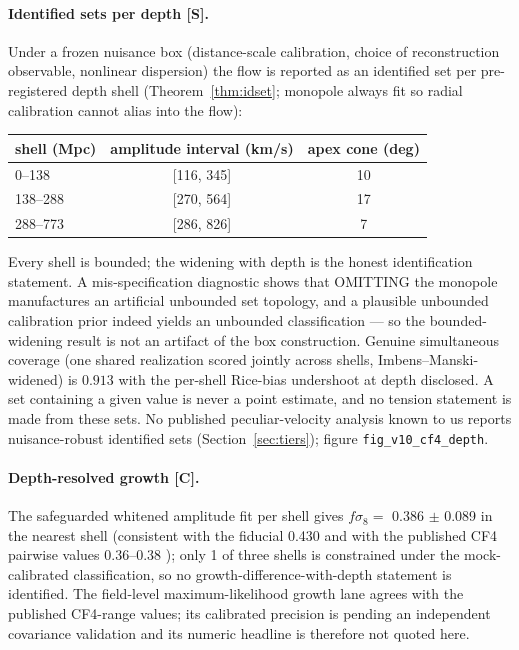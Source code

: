 \documentclass[10pt]{article}
\theoremstyle{definition}
\newcommand{\code}[1]{\texttt{\small #1}}
\newcommand{\tier}[1]{\textbf{[#1]}}
\begin{document}
\paragraph{Identified sets per depth \tier{S}.}
Under a frozen nuisance box (distance-scale calibration, choice of
reconstruction observable, nonlinear dispersion) the flow is reported
as an identified set per pre-registered depth shell
(Theorem~\ref{thm:idset}; monopole always fit so radial calibration
cannot alias into the flow):

\begin{center}\small
\begin{tabular}{lcc}
\toprule shell (Mpc) & amplitude interval (km/s) & apex cone (deg) \\
\midrule
0--138 & [116, 345] & 10 \\
138--288 & [270, 564] & 17 \\
288--773 & [286, 826] & 7 \\ \bottomrule
\end{tabular}
\end{center}

Every shell is bounded; the widening with depth is the honest
identification statement. A mis-specification diagnostic shows that
OMITTING the monopole manufactures an artificial unbounded set
topology, and a plausible unbounded calibration prior indeed yields
an unbounded classification --- so the bounded-widening result is not
an artifact of the box construction. Genuine simultaneous coverage
(one shared realization scored jointly across shells,
Imbens--Manski-widened) is $0.913$ with the per-shell Rice-bias
undershoot at depth disclosed. A set containing a given value is never a
point estimate, and no tension statement is made from these sets.
No published peculiar-velocity analysis known to us reports
nuisance-robust identified sets (Section~\ref{sec:tiers});
figure \code{fig\_v10\_cf4\_depth}.

\paragraph{Depth-resolved growth \tier{C}.}
The safeguarded whitened amplitude fit per shell gives
$f\sigma_8 = $ 0.386 $\pm$ 0.089 in the nearest shell
(consistent with the fiducial 0.430 and with the published CF4
pairwise values $0.36$--$0.38$ \cite{Courtois2023}); only
1 of three shells is constrained under the mock-calibrated
classification, so no growth-difference-with-depth statement is
identified. The field-level maximum-likelihood growth lane agrees with
the published CF4-range values; its calibrated precision is pending an
independent covariance validation and its numeric headline is
therefore not quoted here.
\end{document}
